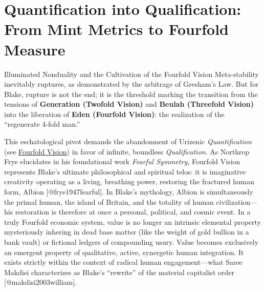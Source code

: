 \documentclass[
  ignorenonframetext,
]{beamer}
\author{\texorpdfstring{}{}}
\date{}
\begin{document}
\section{Quantification into Qualification: From Mint Metrics to
Fourfold
Measure}\label{quantification-into-qualification-from-mint-metrics-to-fourfold-measure}

\begin{frame}{Illuminated Nonduality and the Cultivation of the Fourfold
Vision}
\protect{}\label{sec-illuminated-nonduality}
Meta-stability inevitably ruptures, as demonstrated by the arbitrage of
Gresham's Law. But for Blake, rupture is not the end; it is the
threshold marking the transition from the tensions of \textbf{Generation
(Twofold Vision)} and \textbf{Beulah (Threefold Vision)} into the
liberation of \textbf{Eden (Fourfold Vision)}: the realization of the
``regenerate 4-fold man.''

This eschatological pivot demands the abandonment of Urizenic
\emph{Quantification} (see \hyperlink{sec-four-levels-vision}{Fourfold
Vision}) in favor of infinite, boundless \emph{Qualification}. As
Northrop Frye elucidates in his foundational work \emph{Fearful
Symmetry}, Fourfold Vision represents Blake's ultimate philosophical and
spiritual telos: it is imaginative creativity operating as a living,
breathing power, restoring the fractured human form, Albion
{[}@frye1947fearful{]}. In Blake's mythology, Albion is simultaneously
the primal human, the island of Britain, and the totality of human
civilization---his restoration is therefore at once a personal,
political, and cosmic event. In a truly Fourfold economic system, value
is no longer an intrinsic elemental property mysteriously inhering in
dead base matter (like the weight of gold bullion in a bank vault) or
fictional ledgers of compounding usury. Value becomes exclusively an
emergent property of qualitative, active, synergetic human integration.
It exists strictly within the context of radical human engagement---what
Saree Makdisi characterizes as Blake's ``rewrite'' of the material
capitalist order {[}@makdisi2003william{]}.
\end{frame}
\end{document}
